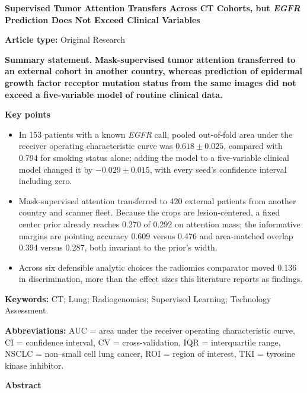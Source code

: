 \documentclass[11pt]{article}
\begin{document}
{\large\bfseries Supervised Tumor Attention Transfers Across CT Cohorts, but
\textit{EGFR} Prediction Does Not Exceed Clinical Variables\par}

\textbf{Article type:} Original Research

\textbf{Summary statement.} \textbf{Mask-supervised tumor attention transferred to
an external cohort in another country, whereas prediction of epidermal growth
factor receptor mutation status from the same images did not exceed a
five-variable model of routine clinical data.}

\textbf{Key points}

\begin{itemize}\itemsep0pt
  \item In 153 patients with a known \textit{EGFR} call, pooled out-of-fold area
    under the receiver operating characteristic curve was $0.618 \pm 0.025$,
    compared with 0.794 for smoking status alone; adding the model to a
    five-variable clinical model changed it by $-0.029 \pm 0.015$, with every
    seed's confidence interval including zero.
  \item Mask-supervised attention transferred to 420 external patients from
    another country and scanner fleet. Because the crops are lesion-centered, a
    fixed center prior already reaches 0.270 of 0.292 on attention mass; the
    informative margins are pointing accuracy 0.609 versus 0.476 and area-matched
    overlap 0.394 versus 0.287, both invariant to the prior's width.
  \item Across six defensible analytic choices the radiomics comparator
    moved 0.136 in discrimination, more than the effect sizes this literature
    reports as findings.
\end{itemize}

\textbf{Keywords:} CT; Lung; Radiogenomics; Supervised Learning; Technology
Assessment.

\textbf{Abbreviations:} AUC = area under the receiver operating characteristic
curve, CI = confidence interval, CV = cross-validation, IQR = interquartile
range, NSCLC = non--small cell lung cancer, ROI = region of interest,
TKI = tyrosine kinase inhibitor.

\clearpage

{\large\bfseries Abstract\par}
\end{document}
